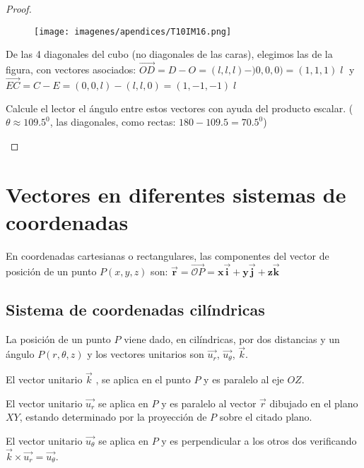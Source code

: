 \begin{proof}\renewcommand{\qedsymbol}{$\diamond$}
\begin{multicols}{2}	
	\begin{figure}[H]
	\centering
	\texttt{[image: imagenes/apendices/T10IM16.png]}
	\end{figure}
De las 4 diagonales del cubo (no diagonales de las caras), elegimos las de la figura, con vectores asociados: $\overrightarrow{OD}=D-O=(l,l,l)-)0,0,0)=(1,1,1)\; l\; $ y $\overrightarrow{EC}=C-E=(0,0,l)-(l,l,0)=(1,-1,-1)\; l$

Calcule el lector el ángulo entre estos vectores con ayuda del producto escalar. \scriptsize{( $\theta \approx 109.5^0$, las diagonales, como rectas: $180-109.5=	70.5^0$)}

\end{multicols}
\end{proof}



\chapter{Vectores en diferentes sistemas de coordenadas}
 \label{VectoresDistintosSistemasCoordenadas}

En coordenadas cartesianas o rectangulares, las componentes del vector de posición de un punto $P(x,y,z)$ son: $\boldsymbol{ \vec r}=\overrightarrow{\mathcal O P}=\boldsymbol{ x\vec i+y\vec j+ z \vec k}$

\section{Sistema de coordenadas cilíndricas}

La posición de un punto $P$ viene dado, en cilíndricas, por dos distancias y un ángulo $P(r,\theta,z)$ y los vectores unitarios son $\overrightarrow{u_r}$,  $\overrightarrow{u_{\theta}}$, $\vec k$.


El vector unitario $\vec k$ , se aplica en el punto $P$ y es paralelo al eje $OZ$.

El vector unitario $\overrightarrow{u_r}$ se aplica en $P$ y es paralelo al vector $\vec r$ dibujado en el plano $XY$, estando determinado por la proyección de $P$ sobre el citado plano.

El vector unitario $\overrightarrow{u_{\theta}}$ se aplica en $P$ y es perpendicular a los otros dos verificando $\vec k \times \overrightarrow{u_r}=\overrightarrow{u_{\theta}}$.

